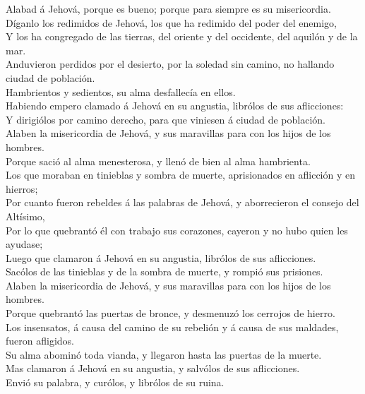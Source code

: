  Alabad á Jehová, porque es bueno; porque para siempre es su
misericordia.\\
 Díganlo los redimidos de Jehová, los que ha redimido del
poder del enemigo,\\
 Y los ha congregado de las tierras, del oriente y del
occidente, del aquilón y de la mar.\\
 Anduvieron perdidos por el desierto, por la soledad sin
camino, no hallando ciudad de población.\\
 Hambrientos y sedientos, su alma desfallecía en ellos.\\
 Habiendo empero clamado á Jehová en su angustia, librólos
de sus aflicciones:\\
 Y dirigiólos por camino derecho, para que viniesen á ciudad
de población.\\
 Alaben la misericordia de Jehová, y sus maravillas para con
los hijos de los hombres.\\
 Porque sació al alma menesterosa, y llenó de bien al alma
hambrienta.\\
 Los que moraban en tinieblas y sombra de muerte,
aprisionados en aflicción y en hierros;\\
 Por cuanto fueron rebeldes á las palabras de Jehová, y
aborrecieron el consejo del Altísimo,\\
 Por lo que quebrantó él con trabajo sus corazones, cayeron
y no hubo quien les ayudase;\\
 Luego que clamaron á Jehová en su angustia, librólos de
sus aflicciones.\\
 Sacólos de las tinieblas y de la sombra de muerte, y
rompió sus prisiones.\\
 Alaben la misericordia de Jehová, y sus maravillas para
con los hijos de los hombres.\\
 Porque quebrantó las puertas de bronce, y desmenuzó los
cerrojos de hierro.\\
 Los insensatos, á causa del camino de su rebelión y á
causa de sus maldades, fueron afligidos.\\
 Su alma abominó toda vianda, y llegaron hasta las puertas
de la muerte.\\
 Mas clamaron á Jehová en su angustia, y salvólos de sus
aflicciones.\\
 Envió su palabra, y curólos, y librólos de su ruina.\\
